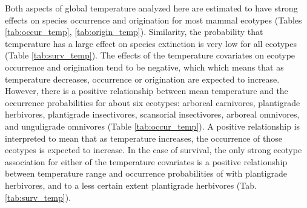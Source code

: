 \documentclass[12pt,letterpaper]{article}
\begin{document}
Both aspects of global temperature analyzed here are estimated to have strong effects on species occurrence and origination for most mammal ecotypes (Tables \ref{tab:occur_temp}, \ref{tab:origin_temp}). Similarity, the probability that temperature has a large effect on species extinction is very low for all ecotypes (Table \ref{tab:surv_temp}). The effects of the temperature covariates on ecotype occurrence and origination tend to be negative, which which means that as temperature decreases, occurrence or origination are expected to increase. However, there is a positive relationship between mean temperature and the occurrence probabilities for about six ecotypes: arboreal carnivores, plantigrade herbivores, plantigrade insectivores, scansorial insectivores, arboreal omnivores, and unguligrade omnivores (Table \ref{tab:occur_temp}). A positive relationship is interpreted to mean that as temperature increases, the occurrence of those ecotypes is expected to increase. In the case of survival, the only strong ecotype association for either of the temperature covariates is a positive relationship between temperature range and occurrence probabilities of with plantigrade herbivores, and to a less certain extent plantigrade herbivores (Tab. \ref{tab:surv_temp}).
\end{document}
